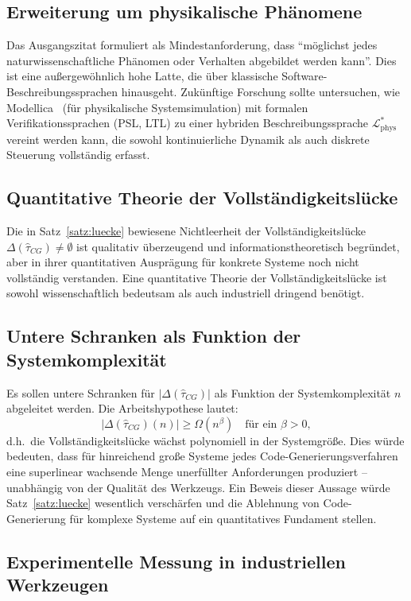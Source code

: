﻿\documentclass[a4paper,12pt]{report}
\theoremstyle{definition}
\begin{document}
\subsection{Erweiterung um physikalische Phänomene}

Das Ausgangszitat formuliert als Mindestanforderung, dass \enquote{möglichst jedes
naturwissenschaftliche Phänomen oder Verhalten abgebildet werden kann}. Dies ist eine
außergewöhnlich hohe Latte, die über klassische Software-Beschreibungssprachen
hinausgeht. Zukünftige Forschung sollte untersuchen, wie Modellica~\cite{modelica2014}
(für physikalische Systemsimulation) mit formalen Verifikationssprachen (PSL, LTL)
zu einer hybriden Beschreibungssprache $\mathcal{L}^*_{\text{phys}}$ vereint werden
kann, die sowohl kontinuierliche Dynamik als auch diskrete Steuerung vollständig
erfasst.

\subsection{Quantitative Theorie der Vollständigkeitslücke}

Die in Satz~\ref{satz:luecke} bewiesene Nichtleerheit der Vollständigkeitslücke
$\Delta(\hat{\tau}_{CG}) \neq \emptyset$ ist qualitativ überzeugend und informationstheoretisch
begründet, aber in ihrer quantitativen Ausprägung für konkrete Systeme noch nicht
vollständig verstanden. Eine quantitative Theorie der Vollständigkeitslücke ist sowohl
wissenschaftlich bedeutsam als auch industriell dringend benötigt.

\subsection{Untere Schranken als Funktion der Systemkomplexität}

Es sollen untere Schranken für $|\Delta(\hat{\tau}_{CG})|$ als Funktion der
Systemkomplexität $n$ abgeleitet werden. Die Arbeitshypothese lautet:
\[
  |\Delta(\hat{\tau}_{CG})(n)| \geq \Omega(n^\beta) \quad \text{für ein } \beta > 0,
\]
d.h.\ die Vollständigkeitslücke wächst polynomiell in der Systemgröße. Dies würde
bedeuten, dass für hinreichend große Systeme jedes Code-Generierungsverfahren
eine superlinear wachsende Menge unerfüllter Anforderungen produziert -- unabhängig
von der Qualität des Werkzeugs. Ein Beweis dieser Aussage würde Satz~\ref{satz:luecke}
wesentlich verschärfen und die Ablehnung von Code-Generierung für komplexe Systeme
auf ein quantitatives Fundament stellen.

\subsection{Experimentelle Messung in industriellen Werkzeugen}
\end{document}
